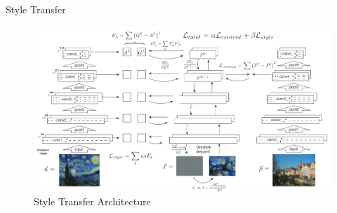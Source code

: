 \documentclass{beamer}
\begin{document}
\begin{frame}{Style Transfer}
\begin{figure}[ht]
\centering
\caption{Style Transfer Architecture}
\includegraphics[width=\textwidth]{img/style-transfer}
\end{figure}
\end{frame}
\end{document}
